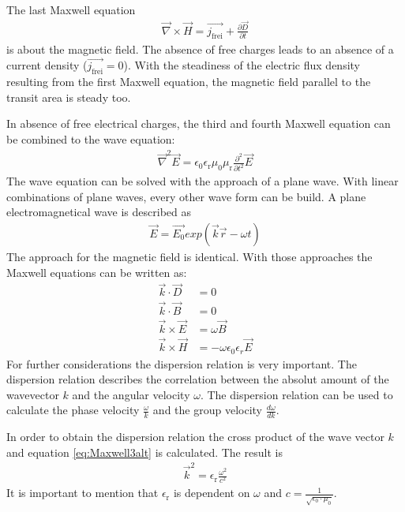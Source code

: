 \documentclass[twoside,english,headsepline=on,DIV=11]{scrartcl}
\numberwithin{equation}{section}
\begin{document}
The last Maxwell equation 
\begin{align}
\vec{\nabla} \times \vec{H} = \vec{j_\text{frei}} + \frac{\partial \vec{D}}{\partial t} \label{eq:Maxwell4}
\end{align}
is about the magnetic field. The absence of free charges leads to an absence of a current density ($\overrightarrow{j_\text{frei}} = 0$). With the steadiness of the electric flux density resulting from the first Maxwell equation, the magnetic field parallel to the transit area is steady too.

In absence of free electrical charges, the third and fourth Maxwell equation can be combined to the wave equation:
\begin{align}
\vec{\nabla}^2 \vec{E} = \epsilon_0 \epsilon_\text{r} \mu_0 \mu_\text{r} \frac{\partial^2}{\partial t^2} \vec{E} \label{eq:Waveequation}
\end{align} 
The wave equation can be solved with the approach of a plane wave. With linear combinations of plane waves, every other wave form can be build. A plane electromagnetical wave is described as
\begin{align}
\vec{E} = \vec{E_0} exp(\vec{k}\vec{r} - \omega t)
\end{align}
The approach for the magnetic field is identical. With those approaches the Maxwell equations can be written as:
\begin{align}
\vec{k} \cdot \vec{D} &= 0 \label{eq:Maxwell1alt} \\
\vec{k} \cdot \vec{B} &= 0 \label{eq:Maxwell2alt} \\
\vec{k} \times \vec{E} &= \omega \vec{B} \label{eq:Maxwell3alt} \\
\vec{k} \times \vec{H} &= -\omega \epsilon_0 \epsilon_r \vec{E} \label{eq:Maxwell4alt}
\end{align}
For further considerations the dispersion relation is very important. The dispersion relation describes the correlation between the absolut amount of the wavevector $k$ and the angular velocity $\omega$. The dispersion relation can be used to calculate the phase velocity $\frac{\omega}{k}$ and the group velocity $\frac{d\omega}{dk}$. 

In order to obtain the dispersion relation the cross product of the wave vector $k$ and equation \ref{eq:Maxwell3alt} is calculated. The result is
\begin{align}
\vec{k}^2 = \epsilon_\text{r} \frac{\omega^2}{c^2} \label{eq:Dispersionrelation}
\end{align}
It is important to mention that $\epsilon_\text{r}$ is dependent on $\omega$ and $c=\frac{1}{\sqrt{\epsilon_0 \cdot \mu_0}}$.
\end{document}
